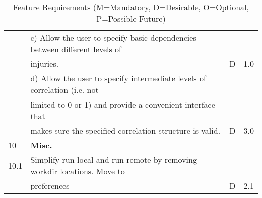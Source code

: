 {\begin{table}[hbt!]
\begin{adjustbox}{max width=\textwidth}
\begin{tabular}{llll}
	 & c) Allow the user to specify basic dependencies between different levels of &&\\
	 & \hspace{1em} injuries. & D & 1.0 \\
	 & d) Allow the user to specify intermediate levels of correlation (i.e. not &&\\
	 & \hspace{1em} limited to 0 or 1) and provide a convenient interface that &&\\
	 & \hspace{1em} makes sure the specified correlation structure is valid. & D & 3.0 \\ \hline    
    10 & \textbf{Misc.} &  &  \\ \hline
	10.1 & Simplify run local and run remote by removing workdir locations. Move to &&\\
	& preferences & D & 2.1  \\ \hline
 \bottomrule                                  
  \end{tabular}
\end{adjustbox}
  \caption{Feature Requirements (M=Mandatory, D=Desirable, O=Optional, P=Possible Future)}             
  \label{tab:featureRequirements_3}                 
\end{table}
}{}